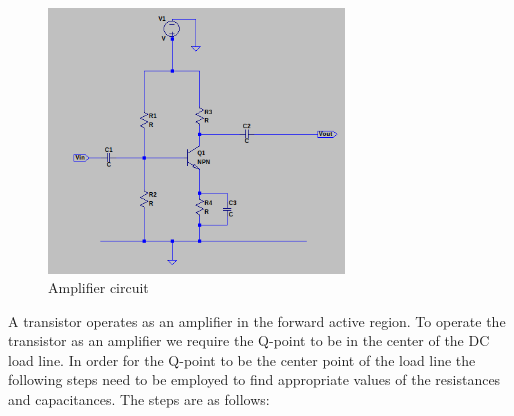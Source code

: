 \documentclass[12pt, a4paper]{article}
\begin{document}
	\begin{figure}[H]
		\centering
		\includegraphics[width=0.7\textwidth]{Images/amplifier_circuit.png}
		\caption{Amplifier circuit}
		\label{fig:amplifier_circuit}
	\end{figure}

	A transistor operates as an amplifier in the forward active region. To operate the transistor as an amplifier we require the Q-point to be in the center of the DC load line. In order for the Q-point to be the center point of the load line the following steps need to be employed to find appropriate values of the resistances and capacitances. The steps are as follows:\\
\end{document}
